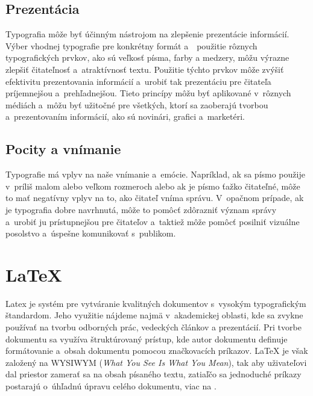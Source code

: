 \documentclass[a4paper, 11pt]{article}
\begin{document}
\subsection{Prezentácia}
Typografia môže byť účinným nástrojom na zlepšenie prezentácie informácií. Výber vhodnej typografie pre konkrétny formát a~~použitie rôznych typografických prvkov, ako sú veľkosť písma, farby a medzery, môžu výrazne zlepšiť čitateľnosť a~atraktívnosť textu. Použitie týchto prvkov môže zvýšiť efektivitu prezentovania informácií a~urobiť tak prezentáciu pre čitateľa príjemnejšou a~prehľadnejšou. Tieto princípy môžu byť aplikované v~rôznych médiách a~môžu byť užitočné pre všetkých, ktorí sa zaoberajú tvorbou a~prezentovaním informácií, ako sú novinári, grafici a~marketéri. \cite{NovotnaMaria2019}

\subsection{Pocity a vnímanie}
Typografie má vplyv na naše vnímanie a~emócie. Napríklad, ak sa písmo použije v~príliš malom alebo veľkom rozmeroch alebo ak je písmo ťažko čitateľné, môže to mať negatívny vplyv na to, ako čitateľ vníma správu. V~opačnom prípade, ak je typografia dobre navrhnutá, môže to pomôcť zdôrazniť význam správy a~urobiť ju prístupnejšou pre čitateľov a~taktiež môže pomôcť posilniť vizuálne posolstvo a~úspešne komunikovať s~publikom. \cite{LUPTON}

\section{\LaTeX}
Latex je systém pre vytváranie kvalitných dokumentov s~vysokým typografickým štandardom. Jeho využitie nájdeme najmä v~akademickej oblasti, kde sa zvykne používať na tvorbu odborných prác, vedeckých článkov a prezentácií. Pri tvorbe dokumentu sa využíva štruktúrovaný prístup, kde autor dokumentu definuje formátovanie a~obsah dokumentu pomocou značkovacích príkazov. \LaTeX{} je však založený na WYSIWYM (\emph{What You See Is What You Mean}), tak aby uživateľovi dal priestor zamerať sa na obsah písaného textu, zatiaľčo sa jednoduché príkazy postarajú o~úhľadnú úpravu celého dokumentu, viac na \cite{Overleaf}.
\end{document}

